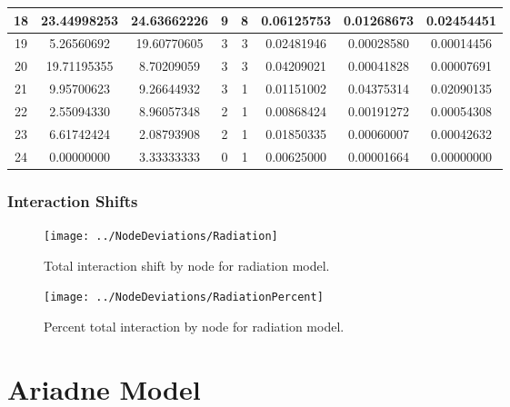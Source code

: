 \documentclass[12pt,a4paper]{thesis}
\begin{document}
\begin{table}[H]
\begin{tabular}{|c|c|c|c|c|c|c|c|}
\hline	18	&	23.44998253	&	24.63662226	&	9	&	8	&	0.06125753	&	0.01268673	&	0.02454451	\\
\hline	19	&	5.26560692	&	19.60770605	&	3	&	3	&	0.02481946	&	0.00028580	&	0.00014456	\\
\hline	20	&	19.71195355	&	8.70209059	&	3	&	3	&	0.04209021	&	0.00041828	&	0.00007691	\\
\hline	21	&	9.95700623	&	9.26644932	&	3	&	1	&	0.01151002	&	0.04375314	&	0.02090135	\\
\hline	22	&	2.55094330	&	8.96057348	&	2	&	1	&	0.00868424	&	0.00191272	&	0.00054308	\\
\hline	23	&	6.61742424	&	2.08793908	&	2	&	1	&	0.01850335	&	0.00060007	&	0.00042632	\\
\hline	24	&	0.00000000	&	3.33333333	&	0	&	1	&	0.00625000	&	0.00001664	&	0.00000000	\\
\hline 
\end{tabular} 
\label{tab:radNodeAfter}
\end{table}

\subsubsection{Interaction Shifts}

\begin{figure}[H]
\centering
\texttt{[image: ../NodeDeviations/Radiation]}
\caption{Total interaction shift by node for radiation model.}
\label{fig:RadiationShift}
\end{figure}

\begin{figure}[H]
\centering
\texttt{[image: ../NodeDeviations/RadiationPercent]}
\caption{Percent total interaction by node for radiation model.}
\label{fig:RadiationPercent}
\end{figure}


\section{Ariadne Model}
\end{document}
